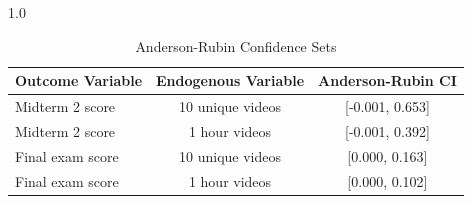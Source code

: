 \begin{spacing}{1.0}
	\begin{table}
		\centering
		\caption{Anderson-Rubin Confidence Sets}
		\label{tab:arci_table}
		\begin{threeparttable}
			\begin{tabular}{lcc}
				\toprule
				Outcome Variable & Endogenous Variable & Anderson-Rubin CI \\
				\midrule
				Midterm 2 score  & 10 unique videos    & [-0.001, 0.653]   \\
				Midterm 2 score  & 1 hour videos       & [-0.001, 0.392]   \\
				Final exam score & 10 unique videos    & [0.000, 0.163]    \\
				Final exam score & 1 hour videos       & [0.000, 0.102]    \\
				\bottomrule
			\end{tabular}
		\end{threeparttable}
	\end{table}
\end{spacing}
